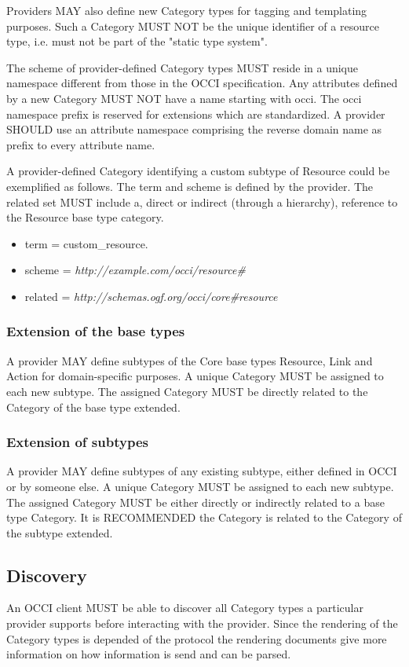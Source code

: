 \documentclass[10pt,a4paper,british]{article}
\begin{document}
Providers MAY also define new Category types for tagging and
templating purposes. Such a Category MUST NOT be the unique identifier
of a resource type, i.e. must not be part of the "static type system".

The scheme of provider-defined Category types MUST reside in a unique
namespace different from those in the OCCI specification. Any
attributes defined by a new Category MUST NOT have a name starting
with occi. The occi namespace prefix is reserved for extensions which
are standardized. A provider SHOULD use an attribute namespace
comprising the reverse domain name as prefix to every attribute name.

A provider-defined Category identifying a custom subtype of Resource
could be exemplified as follows. The term and scheme is defined by the
provider. The related set MUST include a, direct or indirect (through
a hierarchy), reference to the Resource base type category.

\begin{itemize}
\item term = custom\_resource.
\item scheme = \textit{http://example.com/occi/resource\#}
\item related = \textit{http://schemas.ogf.org/occi/core\#resource}
\end{itemize}

\subsubsection{Extension of the base types}
A provider MAY define subtypes of the Core base types Resource, Link
and Action for domain-specific purposes. A unique Category MUST be
assigned to each new subtype. The assigned Category MUST be directly
related to the Category of the base type extended.

\subsubsection{Extension of subtypes}
A provider MAY define subtypes of any existing subtype, either defined
in OCCI or by someone else. A unique Category MUST be assigned to each
new subtype. The assigned Category MUST be either directly or
indirectly related to a base type Category. It is RECOMMENDED the
Category is related to the Category of the subtype extended.

\subsection{Discovery}
An OCCI client MUST be able to discover all Category types a
particular provider supports before interacting with the
provider. Since the rendering of the Category types is depended of the
protocol the rendering documents give more information on how
information is send and can be parsed.
\end{document}
